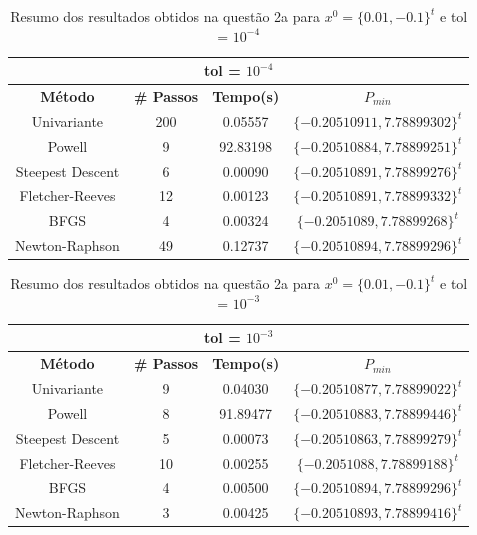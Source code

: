 \documentclass[10pt, a4paper]{article}
\begin{document}
\begin{table}[H]
  \begin{center}
    \begin{tabular}{c|c|c|c}
      \multicolumn{4}{c}{tol = $10^{-4}$}\\
      \hline
      \textbf{Método} & \textbf{\# Passos} & \textbf{Tempo(s)} & \textbf{$P_{min}$}\\
      \hline
      Univariante       & 200   & 0.05557 & $\{-0.20510911, 7.78899302\}^t$\\
      Powell            & 9     & 92.83198 & $\{-0.20510884, 7.78899251\}^t$\\
      Steepest Descent  & 6     & 0.00090 & $\{-0.20510891, 7.78899276\}^t$\\
      Fletcher-Reeves   & 12    & 0.00123 & $\{-0.20510891, 7.78899332\}^t$\\
      BFGS              & 4     & 0.00324 & $\{-0.2051089,  7.78899268\}^t$\\
      Newton-Raphson    & 49    & 0.12737 & $\{-0.20510894, 7.78899296\}^t$\\
    \end{tabular}
  \end{center}
  \caption{Resumo dos resultados obtidos na questão 2a para $x^0 = \{0.01,-0.1\}^t$ e tol = $10^{-4}$}
\end{table}

\begin{table}[H]
  \begin{center}
    \begin{tabular}{c|c|c|c}
      \multicolumn{4}{c}{tol = $10^{-3}$}\\
      \hline
      \textbf{Método} & \textbf{\# Passos} & \textbf{Tempo(s)} & \textbf{$P_{min}$}\\
      \hline
      Univariante       & 9     & 0.04030 & $\{-0.20510877, 7.78899022\}^t$\\
      Powell            & 8     & 91.89477 & $\{-0.20510883, 7.78899446\}^t$\\
      Steepest Descent  & 5     & 0.00073 & $\{-0.20510863, 7.78899279\}^t$\\
      Fletcher-Reeves   & 10    & 0.00255 & $\{-0.2051088, 7.78899188\}^t$\\
      BFGS              & 4     & 0.00500 & $\{-0.20510894, 7.78899296\}^t$\\
      Newton-Raphson    & 3     & 0.00425 & $\{-0.20510893, 7.78899416\}^t$\\
    \end{tabular}
  \end{center}
  \caption{Resumo dos resultados obtidos na questão 2a para $x^0 = \{0.01,-0.1\}^t$ e tol = $10^{-3}$}
\end{table}
\end{document}
